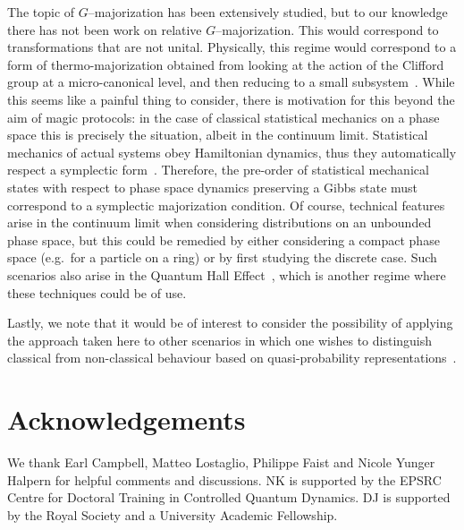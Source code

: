 \documentclass[pra,
aps,
twocolumn,
superscriptaddress,
groupedaddress,
nofootinbib,
reprint
]{revtex4-1}
\begin{document}
The topic of $G$--majorization has been extensively studied, but to our knowledge there has not been work on relative $G$--majorization. This would correspond to transformations that are not unital. Physically, this regime would correspond to a form of thermo-majorization obtained from looking at the action of the Clifford group at a micro-canonical level, and then reducing to a small subsystem~\cite{Pathria_1997}. While this seems like a painful thing to consider, there is motivation for this beyond the aim of magic protocols: in the case of classical statistical mechanics on a phase space this is precisely the situation, albeit in the continuum limit. Statistical mechanics of actual systems obey Hamiltonian dynamics, thus they automatically respect a symplectic form~\cite{Arnold_2000, Pathria_1997}. Therefore, the pre-order of statistical mechanical states with respect to phase space dynamics preserving a Gibbs state must correspond to a symplectic majorization condition. Of course, technical features arise in the continuum limit when considering distributions on an unbounded phase space, but this could be remedied by either considering a compact phase space (e.g.~for a particle on a ring) or by first studying the discrete case. Such scenarios also arise in the Quantum Hall Effect~\cite{Klitzing_1980}, which is another regime where these techniques could be of use.

Lastly, we note that it would be of interest to consider the possibility of applying the approach taken here to other scenarios in which one wishes to distinguish classical from non-classical behaviour based on quasi-probability representations~\cite{Ferrie_2008, barnett_1997,Allahverdyan_2018, arvidsson_2020, halpern_2018, Lostaglio_2018, Levy_2020}.
	



%


\section*{Acknowledgements}
We thank Earl Campbell, Matteo Lostaglio, Philippe Faist and Nicole Yunger Halpern for helpful comments and discussions. NK is supported by the EPSRC Centre for Doctoral Training in Controlled Quantum Dynamics. DJ is supported by the Royal Society and a University Academic Fellowship.
\end{document}
